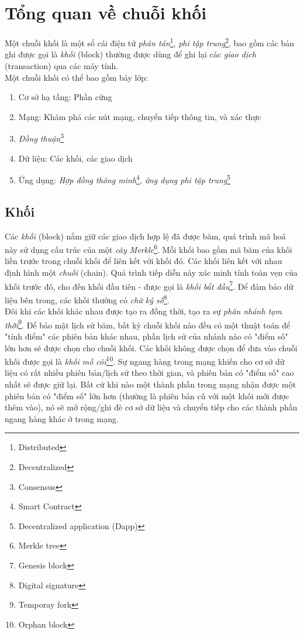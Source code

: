 \section{Tổng quan về chuỗi khối}

Một chuỗi khối là một sổ cái điện tử \textit{phân tán}\footnote{Distributed}, \textit{phi tập trung}\footnote{Decentralized}, bao gồm các bản ghi được gọi là \textit{khối} (block) thường được dùng để ghi lại các \textit{giao dịch} (transaction) qua các máy tính.\\

Một chuỗi khối có thể bao gồm bảy lớp:
\begin{enumerate}
    \item Cơ sở hạ tầng: Phần cứng
    \item Mạng: Khám phá các nút mạng, chuyển tiếp thông tin, và xác thực
    \item \textit{Đồng thuận}\footnote{Consensus}
    \item Dữ liệu: Các khối, các giao dịch
    \item Ứng dụng: \textit{Hợp đồng thông minh}\footnote{Smart Contract}, \textit{ứng dụng phi tập trung}\footnote{Decentralized application (Dapp)}
\end{enumerate}

\subsection{Khối}

Các \textit{khối} (block) nắm giữ các giao dịch hợp lệ đã được băm, quá trình mã hoá này sử dụng cấu trúc của một \textit{cây Merkle}\footnote{Merkle tree}. Mỗi khối bao gồm mã băm của khối liền trước trong chuỗi khối để liên kết với khối đó. Các khối liên kết với nhau định hình một \textit{chuỗi} (chain). Quá trình tiếp diễn này xác minh tính toàn vẹn của khối trước đó, cho đến khối đầu tiên - được gọi là \textit{khối bắt đầu}\footnote{Genesis block}. Để đảm bảo dữ liệu bên trong, các khối thường có \textit{chữ ký số}\footnote{Digital signature}.\\

Đôi khi các khối khác nhau được tạo ra đồng thời, tạo ra sự \textit{phân nhánh tạm thời}\footnote{Temporay fork}. Để bảo mật lịch sử băm, bất kỳ chuỗi khối nào đều có một thuật toán để "tính điểm" các phiên bản khác nhau, phần lịch sử của nhánh nào có "điểm số" lớn hơn sẽ được chọn cho chuỗi khối. Các khối không được chọn để đưa vào chuỗi khối được gọi là \textit{khối mồ côi}\footnote{Orphan block}. Sự ngang hàng trong mạng khiến cho cơ sở dữ liệu có rất nhiều phiên bản/lịch sử theo thời gian, và phiên bản có "điểm số" cao nhất sẽ được giữ lại. Bất cứ khi nào một thành phần trong mạng nhận được một phiên bản có "điểm số" lớn hơn (thường là phiên bản cũ với một khối mới được thêm vào), nó sẽ mở rộng/ghi đè cơ sở dữ liệu và chuyển tiếp cho các thành phần ngang hàng khác ở trong mạng.

